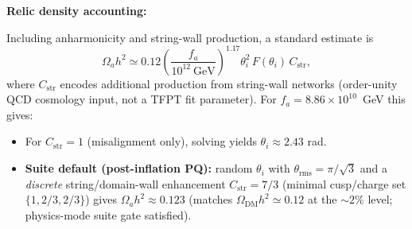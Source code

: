 \textbf{Relic density accounting:}

Including anharmonicity and string-wall production, a standard estimate is
\begin{equation}
    \Omega_a h^2 \simeq 0.12\left(\frac{f_a}{10^{12}~\text{GeV}}\right)^{1.17}\theta_i^2\,F(\theta_i)\,C_{\mathrm{str}},
\end{equation}
where $C_{\mathrm{str}}$ encodes additional production from string-wall networks (order-unity QCD cosmology input, not a TFPT fit parameter).
For $f_a = 8.86 \times 10^{10}$~GeV this gives:
\begin{itemize}[leftmargin=1.5em, topsep=2pt, itemsep=1pt]
    \item For $C_{\mathrm{str}}=1$ (misalignment only), solving yields $\theta_i \approx 2.43$ rad.
    \item \textbf{Suite default (post-inflation PQ):} random $\theta_i$ with $\theta_{\mathrm{rms}}=\pi/\sqrt{3}$ and a \emph{discrete} string/domain-wall enhancement $C_{\mathrm{str}}=7/3$ (minimal cusp/charge set $\{1,2/3,2/3\}$) gives $\Omega_a h^2 \approx 0.123$ (matches $\Omega_{\mathrm{DM}}h^2\simeq 0.12$ at the $\sim 2\%$ level; physics-mode suite gate satisfied).
\end{itemize}

